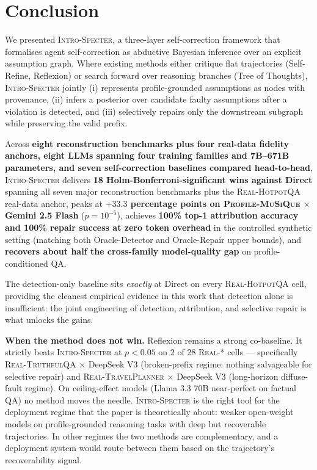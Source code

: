\section{Conclusion}
\label{sec:conclusion}

We presented \textsc{Intro-Specter}, a three-layer self-correction
framework that formalises agent self-correction as abductive
Bayesian inference over an explicit assumption graph. Where
existing methods either critique flat trajectories
(Self-Refine, Reflexion) or search forward over reasoning
branches (Tree of Thoughts), \textsc{Intro-Specter} jointly
(i) represents profile-grounded assumptions as nodes with
provenance, (ii) infers a posterior over candidate faulty
assumptions after a violation is detected, and (iii) selectively
repairs only the downstream subgraph while preserving the valid
prefix.

Across \textbf{eight reconstruction benchmarks plus four
real-data fidelity anchors, eight LLMs spanning four training
families and 7B--671B parameters, and seven self-correction
baselines compared head-to-head}, \textsc{Intro-Specter} delivers
\textbf{18 Holm-Bonferroni-significant wins against Direct}
spanning all seven major reconstruction benchmarks plus the
\textsc{Real-HotpotQA} real-data anchor, peaks at \textbf{$+33.3$
percentage points on \textsc{Profile-MuSiQue} $\times$ Gemini 2.5
Flash} ($p = 10^{-5}$), achieves \textbf{100\% top-1 attribution
accuracy and 100\% repair success at zero token overhead} in the
controlled synthetic setting (matching both Oracle-Detector and
Oracle-Repair upper bounds), and \textbf{recovers about half the
cross-family model-quality gap} on profile-conditioned QA.

The detection-only baseline sits \emph{exactly} at Direct on
every \textsc{Real-HotpotQA} cell, providing the cleanest
empirical evidence in this work that detection alone is
insufficient: the joint engineering of detection, attribution,
and selective repair is what unlocks the gains.

\textbf{When the method does not win.} Reflexion remains a strong
co-baseline. It strictly beats \textsc{Intro-Specter} at
$p < 0.05$ on 2 of 28 \textsc{Real-*} cells --- specifically
\textsc{Real-TruthfulQA} $\times$ DeepSeek V3 (broken-prefix
regime: nothing salvageable for selective repair) and
\textsc{Real-TravelPlanner} $\times$ DeepSeek V3 (long-horizon
diffuse-fault regime). On ceiling-effect models (Llama 3.3 70B
near-perfect on factual QA) no method moves the needle.
\textsc{Intro-Specter} is the right tool for the deployment
regime that the paper is theoretically about: weaker open-weight
models on profile-grounded reasoning tasks with deep but
recoverable trajectories. In other regimes the two methods are
complementary, and a deployment system would route between them
based on the trajectory's recoverability signal.

